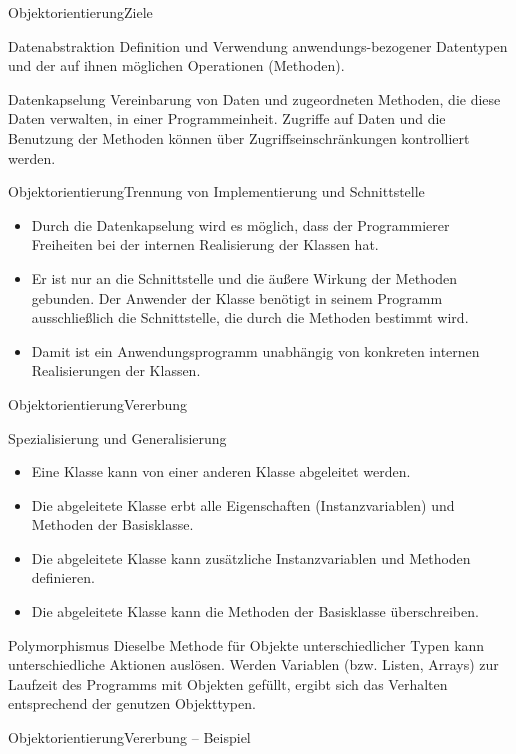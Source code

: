\documentclass[xelatex,aspectratio=169]{beamer}
\begin{document}
\begin{frame}{Objektorientierung}{Ziele}
    \begin{block}{Datenabstraktion}
        Definition und Verwendung anwendungs-bezogener Datentypen und der auf ihnen möglichen Operationen (Methoden).
    \end{block}
    \begin{block}{Datenkapselung}
        Vereinbarung von Daten  und zugeordneten Methoden, die diese Daten verwalten, in einer Programmeinheit.
        Zugriffe auf Daten und die Benutzung der Methoden können über Zugriffseinschränkungen kontrolliert werden.
    \end{block}
\end{frame}

\begin{frame}{Objektorientierung}{Trennung von Implementierung und Schnittstelle}
    \begin{itemize}
        \item Durch die Datenkapselung wird es möglich, dass der Programmierer Freiheiten bei der internen Realisierung der Klassen hat.
        \item Er ist nur an die Schnittstelle und die äußere Wirkung der Methoden gebunden. Der Anwender der Klasse benötigt in seinem Programm ausschließlich die Schnittstelle, die durch die Methoden bestimmt wird.
        \item Damit ist ein Anwendungsprogramm unabhängig von konkreten internen Realisierungen der Klassen.
    \end{itemize}
\end{frame}

\begin{frame}{Objektorientierung}{Vererbung}
    \begin{block}{Spezialisierung und Generalisierung}
        \begin{itemize}
            \item Eine Klasse kann von einer anderen Klasse abgeleitet werden.
            \item Die abgeleitete Klasse erbt alle Eigenschaften (Instanzvariablen) und Methoden der Basisklasse.
            \item Die abgeleitete Klasse kann zusätzliche Instanzvariablen und Methoden definieren.
            \item Die abgeleitete Klasse kann die Methoden der Basisklasse überschreiben.
        \end{itemize}
    \end{block}

    \begin{block}{Polymorphismus}
        Dieselbe Methode für Objekte unterschiedlicher Typen kann unterschiedliche Aktionen auslösen. Werden Variablen (bzw. Listen, Arrays) zur Laufzeit des Programms mit Objekten gefüllt, ergibt sich das Verhalten entsprechend der genutzen Objekttypen.
    \end{block}
\end{frame}

\begin{frame}{Objektorientierung}{Vererbung -- Beispiel}
    \inputminted[firstline=1, lastline=11, linenos]{python}{src/class_inheritance.py}
\end{frame}
\end{document}
